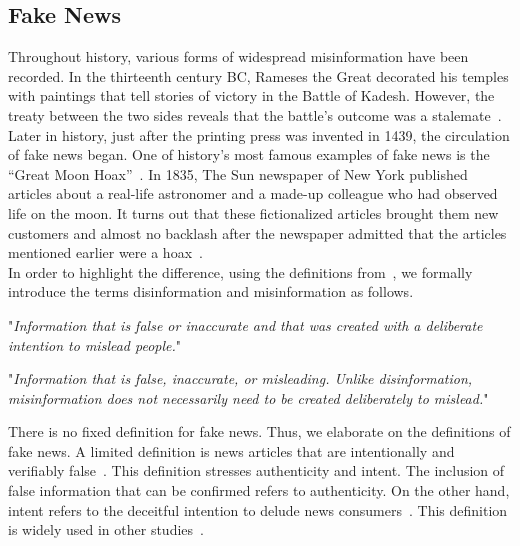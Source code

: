 \subsection{Fake News}
\label{subsec:fakeNewsDetection_fakeNews}
Throughout history, various forms of widespread misinformation have been recorded. In the thirteenth
century BC, Rameses the Great decorated his temples with paintings that tell stories of victory in the Battle
of Kadesh. However, the treaty between the two sides reveals that the battle's outcome was a stalemate~\parencite{HistorysGreatestLies_Weir}. Later in history, just after the printing press was invented in 1439, the circulation of fake news began. One of history's most famous examples of fake news is the “Great Moon Hoax”~\parencite{TheGreatMoonHoax_Foster}. In 1835, The Sun newspaper of New York published articles about a real-life astronomer and a made-up colleague who had observed life on the moon. It turns out that these fictionalized articles brought them new customers and almost no backlash after the newspaper admitted that the articles mentioned earlier were a hoax~\parencite{TheLongAndBrutalHistoryOfFakeNews_Soll}.\\
In order to highlight the difference, using the definitions from~\parencite{ThePsycologyOfFakeNews_Pennycook}, we formally introduce the terms disinformation and misinformation as follows.
\begin{definition}
    "\emph{Information that is false or inaccurate and that was created with a deliberate intention to mislead people.}"~\parencite{ThePsycologyOfFakeNews_Pennycook}
\end{definition}
\begin{definition}
    "\emph{Information that is false, inaccurate, or misleading. Unlike disinformation, misinformation does not necessarily need to be created deliberately to mislead.}"~\parencite{ThePsycologyOfFakeNews_Pennycook}
\end{definition}
There is no fixed definition for fake news. Thus, we elaborate on the definitions of fake news. A limited definition is news articles that are intentionally and verifiably false~\parencite{SocialMediaAndFakeNewsIn2016Election_Allcott}. This definition stresses authenticity and intent. The inclusion of false information that can be confirmed refers to authenticity. On the other hand, intent refers to the deceitful intention to delude news consumers~\parencite{FakeNewsDetectionOnSocialMediaADataMiningPerspective_Shu}. This definition is widely used in other studies~\parencite{AutomaticDeceptionDetection_Conroy, TheFakeNewsSpreadingPlague_Mustafaraj, FakeNewsDetectionOnSocialMediaADataMiningPerspective_Shu}.\\
